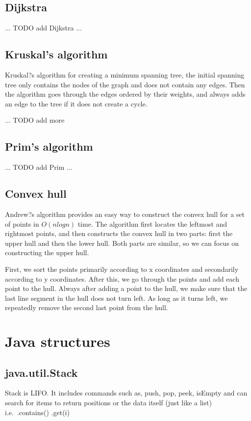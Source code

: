 \documentclass[a4paper]{article}
\begin{document}
\subsection{Dijkstra}
... TODO add Dijkstra ...


\subsection{Kruskal's algorithm}
Kruskal?s algorithm for creating a minimum spanning tree, the initial spanning tree only contains the nodes of the graph and does not contain any edges. Then the algorithm goes through the edges ordered by their weights, and always adds an edge to the tree if it does not create a cycle.


... TODO add more


\subsection{Prim's algorithm}
... TODO add Prim ...


\subsection{Convex hull}
Andrew?s algorithm provides an easy way to construct the convex hull for a set of points in $O(n log n)$ time. The algorithm first locates the leftmost and rightmost points, and then constructs the convex hull in two parts: first the upper hull and then the lower hull. Both parts are similar, so we can focus on constructing the upper hull.

First, we sort the points primarily according to x coordinates and secondarily according to y coordinates. After this, we go through the points and add each point to the hull. Always after adding a point to the hull, we make sure that the last line segment in the hull does not turn left. As long as it turns left, we repeatedly remove the second last point from the hull.



\section{Java structures}

\subsection{java.util.Stack}
Stack is LIFO. It includes commands such as, push, pop, peek, isEmpty and can search for items to return positions or the data itself (just like a list) i.e.\ .contains() .get(i)
\end{document}
